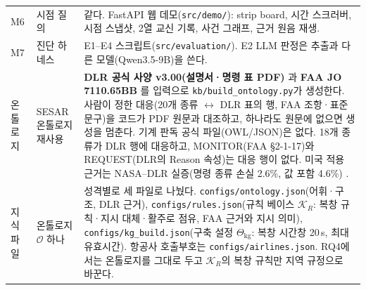 \documentclass[10pt,a4paper]{article}
\newcommand{\Ont}{\mathcal{O}}
\newcommand{\KR}{\mathcal{K}_R}
\newcommand{\Cfg}{\Theta_{\mathrm{kg}}}
\newcommand{\cmd}[1]{\textsf{\small #1}}
\begin{document}
\begin{center}
\begin{tabularx}{\textwidth}{@{}l>{\raggedright\arraybackslash}p{4.0cm}>{\raggedright\arraybackslash}X@{}}
M6 & 시점 질의 & 같다. FastAPI 웹 데모(\texttt{src/demo/}): strip board, 시간 스크러버, 시점 스냅샷, 2열 교신 기록, 사건 그래프, 근거 원음 재생.\\
M7 & 진단 하네스 & E1--E4 스크립트(\texttt{src/evaluation/}). E2 LLM 판정은 추출과 다른 모델(Qwen3.5-9B)을 쓴다.\\
온톨로지 & SESAR 온톨로지 재사용 & \textbf{DLR 공식 사양 v3.00(설명서·명령 표 PDF)} \cite{dlr2025}과 \textbf{FAA JO 7110.65BB} \cite{faa7110}를 입력으로 \texttt{kb/build\_ontology.py}가 생성한다. 사람이 정한 대응(20개 종류 $\leftrightarrow$ DLR 표의 행, FAA 조항·표준 문구)을 코드가 PDF 원문과 대조하고, 하나라도 원문에 없으면 생성을 멈춘다. 기계 판독 공식 파일(OWL/JSON)은 없다. 18개 종류가 DLR 행에 대응하고, \cmd{MONITOR}(FAA §2-1-17)와 \cmd{REQUEST}(DLR의 Reason 속성)는 대응 행이 없다. 미국 적용 근거는 NASA--DLR 실증(명령 종류 손실 2.6\%, 값 포함 4.6\%) \cite{helmke2025loss}.\\
지식 파일 & 온톨로지 $\Ont$ 하나 & 성격별로 세 파일로 나눴다. \texttt{configs/ontology.json}(어휘·구조, DLR 근거), \texttt{configs/rules.json}(규칙 베이스 $\KR$: 복창 규칙·지시 대체·활주로 점유, FAA 근거와 지시 의미), \texttt{configs/kg\_build.json}(구축 설정 $\Cfg$: 복창 시간창 20\,s, 최대 유효시간). 항공사 호출부호는 \texttt{configs/airlines.json}. RQ4에서는 온톨로지를 그대로 두고 $\KR$의 복창 규칙만 지역 규정으로 바꾼다.\\
\bottomrule
\end{tabularx}
\end{center}
\end{document}
